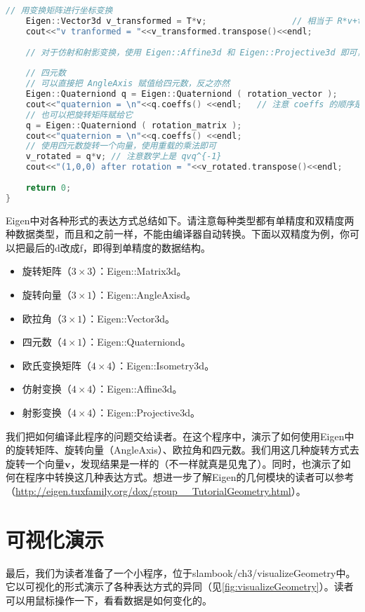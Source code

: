 \begin{lstlisting}[language=c++,caption=slambook/ch3/useGeometry/useGeometry.cpp]
	// 用变换矩阵进行坐标变换
	Eigen::Vector3d v_transformed = T*v;                 // 相当于 R*v+t
	cout<<"v tranformed = "<<v_transformed.transpose()<<endl;
	
	// 对于仿射和射影变换，使用 Eigen::Affine3d 和 Eigen::Projective3d 即可，略
	
	// 四元数
	// 可以直接把 AngleAxis 赋值给四元数，反之亦然
	Eigen::Quaterniond q = Eigen::Quaterniond ( rotation_vector );
	cout<<"quaternion = \n"<<q.coeffs() <<endl;   // 注意 coeffs 的顺序是 (x,y,z,w)，w 为实部，前三者为虚部
	// 也可以把旋转矩阵赋给它
	q = Eigen::Quaterniond ( rotation_matrix );
	cout<<"quaternion = \n"<<q.coeffs() <<endl;
	// 使用四元数旋转一个向量，使用重载的乘法即可
	v_rotated = q*v; // 注意数学上是 qvq^{-1}
	cout<<"(1,0,0) after rotation = "<<v_rotated.transpose()<<endl;
	
	return 0;
}
\end{lstlisting}

Eigen中对各种形式的表达方式总结如下。请注意每种类型都有单精度和双精度两种数据类型，而且和之前一样，不能由编译器自动转换。下面以双精度为例，你可以把最后的d改成f，即得到单精度的数据结构。
\begin{itemize}
	\item 旋转矩阵（$3 \times 3$）：Eigen::Matrix3d。
	\item 旋转向量（$3 \times 1$）：Eigen::AngleAxisd。
	\item 欧拉角（$3 \times 1$）：Eigen::Vector3d。
	\item 四元数（$4 \times 1$）：Eigen::Quaterniond。
	\item 欧氏变换矩阵（$4 \times 4$）：Eigen::Isometry3d。
	\item 仿射变换（$4 \times 4$）：Eigen::Affine3d。
	\item 射影变换（$4 \times 4$）：Eigen::Projective3d。
\end{itemize}

我们把如何编译此程序的问题交给读者。在这个程序中，演示了如何使用Eigen中的旋转矩阵、旋转向量（AngleAxis）、欧拉角和四元数。我们用这几种旋转方式去旋转一个向量$\bm{v}$，发现结果是一样的（不一样就真是见鬼了）。同时，也演示了如何在程序中转换这几种表达方式。想进一步了解Eigen的几何模块的读者可以参考（\url{http://eigen.tuxfamily.org/dox/group__TutorialGeometry.html}）。

\clearpage
\section{可视化演示}
最后，我们为读者准备了一个小程序，位于slambook/ch3/visualizeGeometry中。它以可视化的形式演示了各种表达方式的异同（见\autoref{fig:visualizeGeometry}）。读者可以用鼠标操作一下，看看数据是如何变化的。

